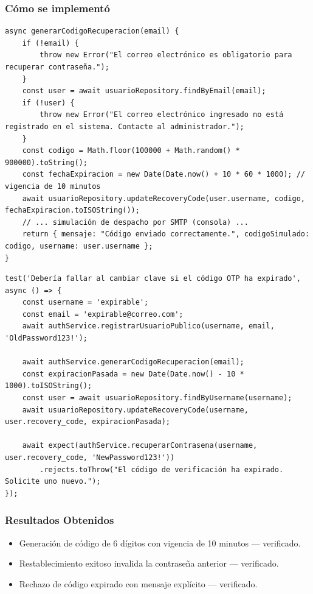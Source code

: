 \documentclass[12pt,a4paper]{article}
\begin{document}
\subsubsection*{Cómo se implementó}

\begin{lstlisting}[caption={Generación y expiración del código OTP (\texttt{AuthService.js})}]
async generarCodigoRecuperacion(email) {
    if (!email) {
        throw new Error("El correo electrónico es obligatorio para recuperar contraseña.");
    }
    const user = await usuarioRepository.findByEmail(email);
    if (!user) {
        throw new Error("El correo electrónico ingresado no está registrado en el sistema. Contacte al administrador.");
    }
    const codigo = Math.floor(100000 + Math.random() * 900000).toString();
    const fechaExpiracion = new Date(Date.now() + 10 * 60 * 1000); // vigencia de 10 minutos
    await usuarioRepository.updateRecoveryCode(user.username, codigo, fechaExpiracion.toISOString());
    // ... simulación de despacho por SMTP (consola) ...
    return { mensaje: "Código enviado correctamente.", codigoSimulado: codigo, username: user.username };
}
\end{lstlisting}

\begin{lstlisting}[caption={Prueba de expiración del código OTP (\texttt{AuthService.test.js})}]
test('Debería fallar al cambiar clave si el código OTP ha expirado', async () => {
    const username = 'expirable';
    const email = 'expirable@correo.com';
    await authService.registrarUsuarioPublico(username, email, 'OldPassword123!');

    await authService.generarCodigoRecuperacion(email);
    const expiracionPasada = new Date(Date.now() - 10 * 1000).toISOString();
    const user = await usuarioRepository.findByUsername(username);
    await usuarioRepository.updateRecoveryCode(username, user.recovery_code, expiracionPasada);

    await expect(authService.recuperarContrasena(username, user.recovery_code, 'NewPassword123!'))
        .rejects.toThrow("El código de verificación ha expirado. Solicite uno nuevo.");
});
\end{lstlisting}

\subsubsection*{Resultados Obtenidos}
\begin{itemize}[nosep]
    \item Generación de código de 6 dígitos con vigencia de 10 minutos — verificado.
    \item Restablecimiento exitoso invalida la contraseña anterior — verificado.
    \item Rechazo de código expirado con mensaje explícito — verificado.
\end{itemize}
\end{document}

